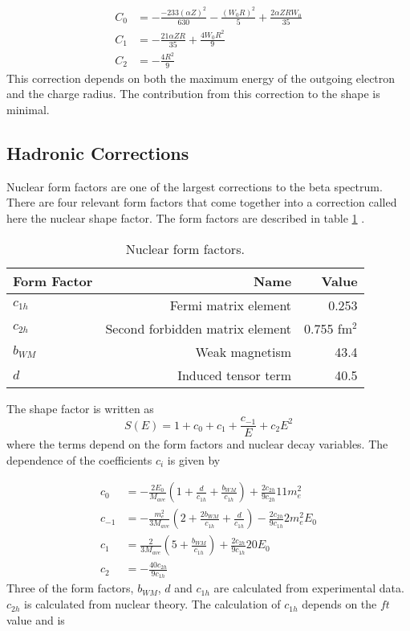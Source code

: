 \documentclass[../MaxHughesThesis.tex]{subfiles}
\begin{document}
\begin{equation}
	\label{eq:csconvocorrection}
	\begin{split}
	C_{0} & = -\frac{-233(\alpha Z)^{2}}{630} - \frac{(W_{0} R)^{2}}{5} + \frac{2 \alpha Z R W_{0}}{35} \\
	C_{1} & = -\frac{21 \alpha Z R}{35} + \frac{4 W_{0} R^{2}}{9} \\
	C_{2} & = -\frac{4 R^{2}}{9}
	\end{split}
\end{equation}
This correction depends on both the maximum energy of the outgoing electron and the charge radius.
The contribution from this correction to the shape is minimal. 

\subsection{Hadronic Corrections}

Nuclear form factors are one of the largest corrections to the beta spectrum.
There are four relevant form factors that come together into a correction called here the nuclear shape factor.
The form factors are described in table \ref{tab:formfact} \cite{Min11} \cite{Cal77}.
\begin{table}[!hbt]
	\centering
	\caption{Nuclear form factors.}
		\begin{tabular}{lrr}
		Form Factor & Name & Value \\ \hline
		$c_{1h}$ & Fermi matrix element & 0.253  \\
		$c_{2h}$ & Second forbidden matrix element & 0.755 fm$^{2}$  \\
		$b_{WM}$ & Weak magnetism & 43.4   \\
		$d$ & Induced tensor term & 40.5 
		\end{tabular}
	\label{tab:formfact}
\end{table}
The shape factor is written as 
\begin{equation}
	\label{eq:shapefactor}
	S(E) = 1 + c_{0} + c_{1} + \frac{c_{-1}}{E} + c_{2}E^{2}	
\end{equation}
where the terms depend on the form factors and nuclear decay variables.
The dependence of the coefficients $c_{i}$ is given by\cite{Cal77}

\begin{equation}
	\label{eq:sfcs}
	\begin{split}
	c_{0} & = -\frac{2 E_{0}}{M_{ave}}(1 + \frac{d}{c_{1h}} + \frac{b_{WM}}{c_{1h}})  + \frac{2 c_{2h}}{9 c_{2h}} 11 m_{e}^{2} \\
	c_{-1} & = -\frac{m_{e}^{2}}{3M_{ave}} (2 + \frac{2b_{WM}}{c_{1h}} + \frac{d}{c_{1h}})  - \frac{2 c_{2h}}{9 c_{1h}} 2 m_{e}^{2} E_{0}\\
	c_{1} & =  \frac{2}{3M_{ave}} (5 + \frac{b_{WM}}{c_{1h}}) + \frac{2 c_{2h}}{9 c_{1h}} 20 E_{0} \\
	c_{2} & = -\frac{40 c_{2h}}{9 c_{1h}} 
	\end{split}
\end{equation}
Three of the form factors, $b_{WM}$, $d$ and $c_{1h}$ are calculated from experimental data. 
$c_{2h}$ is calculated from nuclear theory. 
The calculation of $c_{1h}$ depends on the $ft$ value and is \cite{Min11}
\end{document}
